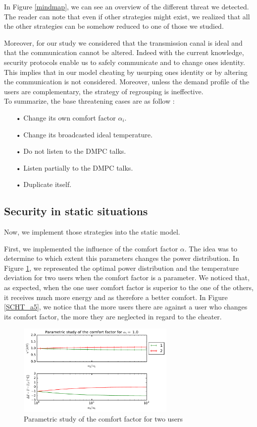 \documentclass[conference]{IEEEtran}
\begin{document}
In Figure \ref{mindmap}, we can see an overview of the different threat we detected. The reader can note that even if other strategies might exist, we realized  that all the other strategies can be somehow reduced to one of those we studied. 

Moreover, for our study we considered that the transmission canal is ideal and that the communication cannot be altered. Indeed with the current knowledge, security protocols enable us to safely communicate and to change ones identity. This implies that in our model cheating by usurping ones identity or by altering the communication is not considered. Moreover, unless the demand profile of the users are complementary, the strategy of regrouping is ineffective. \\

To summarize, the base threatening cases are as follow : 
\begin{itemize}
\item[•] Change its own comfort factor $\alpha_i$.
\item[•] Change its broadcasted ideal temperature.
\item[•] Do not listen to the DMPC talks.
\item[•] Listen partially to the DMPC talks.
\item[•] Duplicate itself.
\end{itemize}

\subsection{Security in static situations}
Now, we implement those strategies into the static model. 

First, we implemented the influence of the comfort factor $\alpha$. The idea was to determine to which extent this parameters changes the power distribution. In Figure \ref{SCHT_a2}, we represented the optimal power distribution and the temperature deviation for two users when the comfort factor is a parameter. We noticed that, as expected, when the one user comfort factor is superior to the one of the others,  it receives much more energy and as therefore a better comfort. In Figure \ref{SCHT_a5}, we notice that the more users there are against a user who changes its comfort factor, the more they are neglected in regard to the cheater.

\begin{figure}[H]
\centering
\includegraphics[width=3in]{statcht2alpZ.pdf}
\caption{Parametric study of the comfort factor for two users}
\label{SCHT_a2}
\end{figure}
\end{document}
